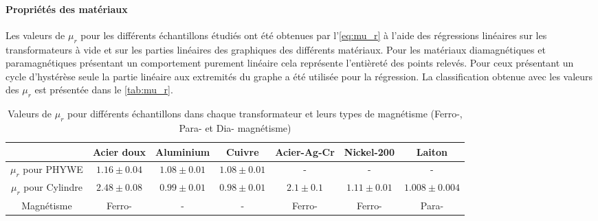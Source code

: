 \paragraph{Propriétés des matériaux}
Les valeurs de \(\mu_r\) pour les différents échantillons étudiés ont été obtenues par l'\autoref{eq:mu_r} à l'aide des régressions linéaires sur les transformateurs à vide et sur les parties linéaires des graphiques des différents matériaux. Pour les matériaux diamagnétiques et paramagnétiques présentant un comportement purement linéaire cela représente l'entièreté des points relevés. Pour ceux présentant un cycle d'hystérèse seule la partie linéaire aux extremités du graphe a été utilisée pour la régression. La classification obtenue avec les valeurs des \(\mu_r\) est présentée dans le \autoref{tab:mu_r}.

\begin{table}[h]
    \vspace{5pt}
    \centering
    \begin{adjustbox}{width=\textwidth}
        \begin{tabulary}{\linewidth}{|c c c c c c c|}
            \toprule
            & Acier doux & Aluminium & Cuivre & Acier-Ag-Cr & Nickel-200 & Laiton \\
            \midrule
            \(\mu_r\) pour PHYWE & \(1.16 \pm 0.04\) & \(1.08 \pm 0.01\) & \(1.08 \pm 0.01\) & - & - & - \\
            \(\mu_r\) pour Cylindre & \(2.48 \pm 0.08\) & \(0.99 \pm 0.01\) & \(0.98 \pm 0.01\) & \(2.1 \pm 0.1\) & \(1.11 \pm 0.01\) & \(1.008 \pm 0.004\) \\
            Magnétisme & Ferro- & - & - & Ferro- & Ferro- & Para- \\
            \bottomrule
        \end{tabulary}
    \end{adjustbox}
    \caption{Valeurs de \(\mu_r\) pour différents échantillons dans chaque transformateur et leurs types de magnétisme (Ferro-, Para- et Dia- magnétisme)}
    \label{tab:mu_r}
\end{table}


